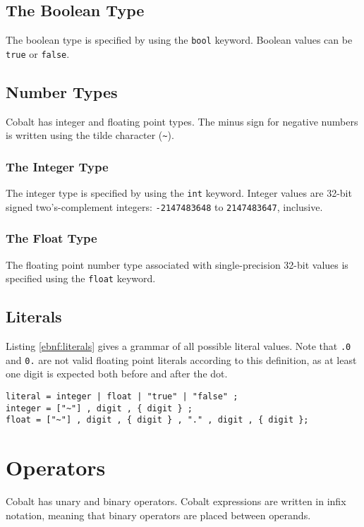 \documentclass[a4paper,appendixprefix]{scrreprt}
\begin{document}
\section{The Boolean Type}
The boolean type is specified by using the \verb!bool! keyword. Boolean values can be \verb!true! or \verb!false!.

\section{Number Types}
Cobalt has integer and floating point types. The minus sign for negative numbers is written using the tilde character (\verb!~!).

\subsection{The Integer Type}
The integer type is specified by using the \verb!int! keyword. Integer values are 32-bit signed two's-complement integers: \verb!-2147483648! to \verb!2147483647!, inclusive.

\subsection{The Float Type}
The floating point number type associated with single-precision 32-bit values is specified using the \verb!float! keyword.

\section{Literals}
Listing \ref{ebnf:literals} gives a grammar of all possible literal values. Note that \verb!.0! and \verb!0.! are not valid floating point literals according to this definition, as at least one digit is expected both before and after the dot.

\begin{lstlisting}[label={ebnf:literals},caption={Literals Grammar}]
literal = integer | float | "true" | "false" ;
integer = ["~"] , digit , { digit } ;
float = ["~"] , digit , { digit } , "." , digit , { digit };
\end{lstlisting}

\chapter{Operators}\label{operators}
Cobalt has unary and binary operators. Cobalt expressions are written in infix notation, meaning that binary operators are placed between operands.
\end{document}
